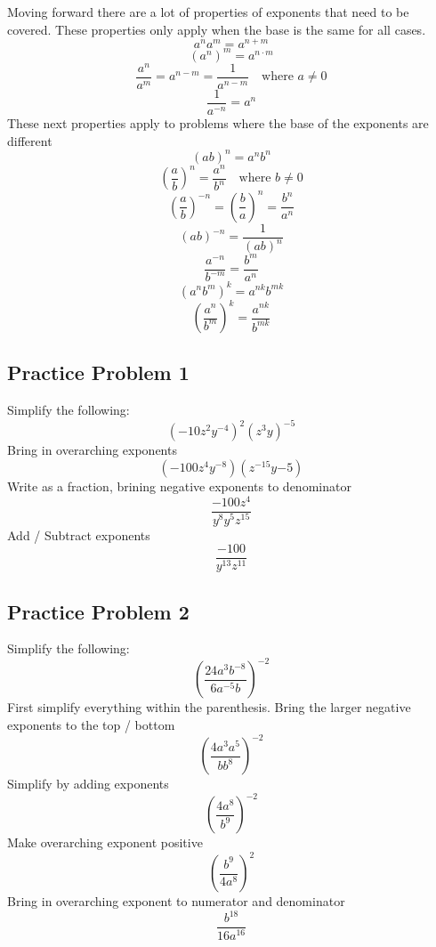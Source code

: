 \documentclass[12pt, letterpaper, oneside]{book}
\begin{document}
Moving forward there are a lot of properties of exponents that need to be covered. These properties only apply when the base is the same for all cases.
\begin{equation}
    a^n a^m = a^{n + m}
\end{equation}
\begin{equation}
    (a^n)^m = a^{n \cdot m}
\end{equation}
\begin{equation}
    \frac{a^n}{a^m} = a^{n - m} = \frac{1}{a^{n-m}} \quad \text{where } a \neq 0
\end{equation}
\begin{equation}
    \frac{1}{a^{-n}} = a^n
\end{equation}
These next properties apply to problems where the base of the exponents are different
\begin{equation}
    (ab)^n = a^n b^n
\end{equation}
\begin{equation}
    \left(\frac{a}{b}\right)^n = \frac{a^n}{b^n} \quad \text{where } b \neq 0
\end{equation}
\begin{equation}
    \left(\frac{a}{b}\right)^{-n} = \left(\frac{b}{a}\right)^n = \frac{b^n}{a^n} 
\end{equation}
\begin{equation}
    (ab)^{-n} = \frac{1}{(ab)^n} 
\end{equation}
\begin{equation}
    \frac{a^{-n}}{b^{-m}} = \frac{b^m}{a^n} 
\end{equation}
\begin{equation}
    (a^nb^m)^k = a^{nk}b^{mk} 
\end{equation}
\begin{equation}
    \left(\frac{a^n}{b^m}\right)^k = \frac{a^{nk}}{b^{mk}}
\end{equation}

\subsection{Practice Problem 1}
Simplify the following:
\[ (-10z^2y^{-4})^2(z^3y)^{-5} \]
Bring in overarching exponents
\[ (-100z^4y^{-8})(z^{-15}y{-5}) \]
Write as a fraction, brining negative exponents to denominator
\[ \frac{-100z^4}{y^8y^5z^{15}} \]
Add / Subtract exponents
\[ \frac{-100}{y^{13}z^{11}} \]



\subsection{Practice Problem 2}
Simplify the following:
\[ \left(\frac{24a^3b^{-8}}{6a^{-5}b}\right)^{-2} \]
First simplify everything within the parenthesis. Bring the larger negative exponents to the top / bottom
\[ \left(\frac{4a^3a^5}{bb^8}\right)^{-2} \]
Simplify by adding exponents
\[ \left(\frac{4a^8}{b^9}\right)^{-2} \]
Make overarching exponent positive
\[ \left(\frac{b^9}{4a^8}\right)^{2} \]
Bring in overarching exponent to numerator and denominator
\[ \frac{b^{18}}{16a^{16}} \]
\end{document}
